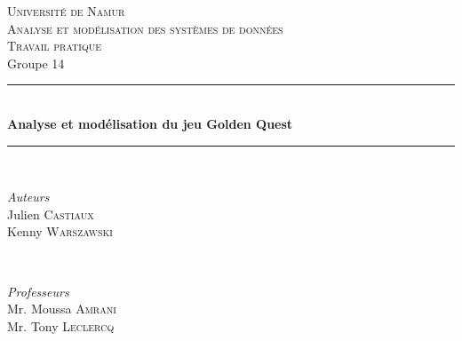 \documentclass[11pt]{article}
\begin{document}

\begin{titlepage} %
	\newcommand{\HRule}{\rule{\linewidth}{0.5mm}} %
	
	\center %
	
	
	\textsc{\LARGE Université de Namur}\\[1.5cm] %
	
	\textsc{\Large Analyse et modélisation des systèmes de données}\\[0.5cm] %
	
	\textsc{\large Travail pratique}\\Groupe 14\\[0.5cm] %
	
	
	\HRule\\[0.4cm]
	
	{\huge\bfseries Analyse et modélisation du jeu Golden Quest}\\[0.4cm] %
	
	\HRule\\[1.5cm]
	
	
	\begin{minipage}{0.4\textwidth}
		\begin{flushleft}
			\textit{Auteurs}\\
			\large Julien \textsc{Castiaux}
			\\
			\large Kenny \textsc{Warszawski}
		\end{flushleft}

	\end{minipage}
	~
	\begin{minipage}{0.4\textwidth}
		\begin{flushright}
			\large
			\textit{Professeurs}\\
			Mr. Moussa \textsc{Amrani}\\
			Mr. Tony \textsc{Leclercq}
		\end{flushright}
	\end{minipage}
	

\end{titlepage}
\end{document}
